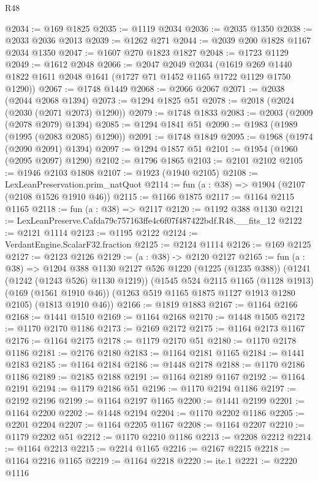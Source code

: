 \begin{lexlean}{R48}
\begin{coremodule}
@2034 := @169 @1825
@2035 := @1119 @2034
@2036 := @2035 @1350
@2038 := @2033 @2036 @2013
@2039 := @1262 @271
@2044 := @2039 @200 @1828 @1167 @2034 @1350
@2047 := @1607 @270 @1823 @1827
@2048 := @1723 @1129
@2049 := @1612 @2048
@2066 := @2047
    @2049
    @2034
    (@1619 @269 @1440 @1822 @1611 @2048 @1641 (@1727 @71 @1452 @1165 @1722 @1129 @1750 @1290))
@2067 := @1748 @1449
@2068 := @2066 @2067
@2071 := @2038 (@2044 @2068 @1394)
@2073 := @1294 @1825 @51
@2078 := @2018 (@2024 (@2030 (@2071 @2073) @1290))
@2079 := @1748 @1833
@2083 := @2003 (@2009 (@2078 @2079) @1394)
@2085 := @1294 @1841 @51
@2090 := @1983 (@1989 (@1995 (@2083 @2085) @1290))
@2091 := @1748 @1849
@2095 := @1968 (@1974 (@2090 @2091) @1394)
@2097 := @1294 @1857 @51
@2101 := @1954 (@1960 (@2095 @2097) @1290)
@2102 := @1796 @1865
@2103 := @2101 @2102
@2105 := @1946 @2103 @1808
@2107 := @1923 (@1940 @2105)
@2108 := LexLeanPreservation.prim_natQuot
@2114 := fun (a : @38) => @1904 (@2107 (@2108 @1526 @1910 @46))
@2115 := @1166 @1875
@2117 := @1164 @2115 @1165
@2118 := fun (a : @38) => @2117
@2120 := @1192 @388 @1130
@2121 := LexLeanPreserve.Cafda79c757163ffe4c6f07f487422bdf.R48.__fits_12
@2122 := @2121 @1114
@2123 := @1195 @2122
@2124 := VerdantEngine.ScalarF32.fraction
@2125 := @2124 @1114
@2126 := @169 @2125
@2127 := @2123 @2126
@2129 := (a : @38) -> @2120 @2127
@2165 := fun (a : @38) =>
  @1204
    @388
    @1130
    @2127
    @526
    @1220
    (@1225 (@1235 @388))
    (@1241 (@1242 (@1243 @526) @1130 @1219))
    (@1545
      @524
      @2115
      @1165
      (@1128 @1913)
      (@169 (@1561 @1910 @46))
      (@1263 @519 @1165 @1875 @1127 @1913 @1280 @2105)
      (@1813 @1910 @46))
@2166 := @1819 @1883
@2167 := @1164 @2166
@2168 := @1441 @1510
@2169 := @1164 @2168
@2170 := @1448 @1505
@2172 := @1170 @2170 @1186
@2173 := @2169 @2172
@2175 := @1164 @2173 @1167
@2176 := @1164 @2175
@2178 := @1179 @2170 @51
@2180 := @1170 @2178 @1186
@2181 := @2176 @2180
@2183 := @1164 @2181 @1165
@2184 := @1441 @2183
@2185 := @1164 @2184
@2186 := @1448 @2178
@2188 := @1170 @2186 @1186
@2189 := @2185 @2188
@2191 := @1164 @2189 @1167
@2192 := @1164 @2191
@2194 := @1179 @2186 @51
@2196 := @1170 @2194 @1186
@2197 := @2192 @2196
@2199 := @1164 @2197 @1165
@2200 := @1441 @2199
@2201 := @1164 @2200
@2202 := @1448 @2194
@2204 := @1170 @2202 @1186
@2205 := @2201 @2204
@2207 := @1164 @2205 @1167
@2208 := @1164 @2207
@2210 := @1179 @2202 @51
@2212 := @1170 @2210 @1186
@2213 := @2208 @2212
@2214 := @1164 @2213
@2215 := @2214 @1165
@2216 := @2167 @2215
@2218 := @1164 @2216 @1165
@2219 := @1164 @2218
@2220 := ite.{1}
@2221 := @2220 @1116

\end{coremodule}
\end{lexlean}
